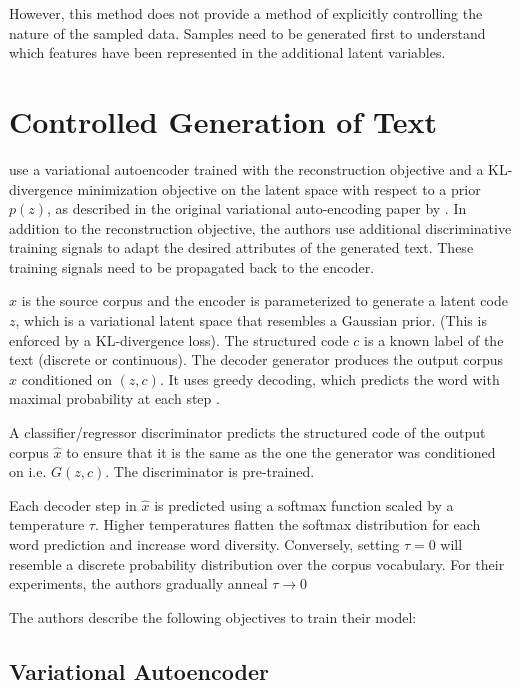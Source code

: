 However, this method does not provide a method of explicitly controlling the nature of the sampled data. Samples need to be generated first to understand which features have been represented in the additional latent variables.


\section{Controlled Generation of Text}

\cite{hu2017toward} use a variational autoencoder trained with the reconstruction objective and a KL-divergence minimization objective on the latent space with respect to a prior $p(z)$, as described in the original variational auto-encoding paper by \cite{kingma2013auto}. In addition to the reconstruction objective, the authors use additional discriminative training signals to adapt the desired attributes of the generated text. These training signals need to be propagated back to the encoder.

$x$ is the source corpus and the encoder is parameterized to generate a latent code $z$, which is a variational latent space that resembles a Gaussian prior. (This is enforced by a KL-divergence loss). The structured code $c$ is a known label of the text (discrete or continuous). The decoder generator produces the output corpus $\hat{x}$ conditioned on $(z, c)$. It uses greedy decoding, which predicts the word with maximal probability at each step \citep{langlais2007greedy}.

A classifier/regressor discriminator predicts the structured code of the output corpus $\hat{x}$ to ensure that it is the same as the one the generator was conditioned on i.e. $G(z, c)$. The discriminator is pre-trained.

Each decoder step in $\hat{x}$ is predicted using a softmax function scaled by a temperature $\tau$. Higher temperatures flatten the softmax distribution for each word prediction and increase word diversity. Conversely, setting $\tau = 0$ will resemble a discrete probability distribution over the corpus vocabulary. For their experiments, the authors gradually anneal $\tau \rightarrow 0$

The authors describe the following objectives to train their model:

\subsection{Variational Autoencoder}

